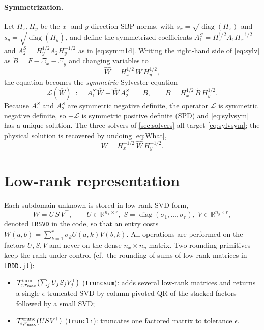 \documentclass[hidelinks,onefignum,onetabnum]{siamart250211}
\newcommand{\R}{\mathbb{R}}
\newcommand{\Hx}{H_x}
\newcommand{\Hy}{H_y}
\newcommand{\Aone}{A_1}
\newcommand{\Atwo}{A_2}
\newcommand{\AoneS}{A_1^{S}}
\newcommand{\AtwoS}{A_2^{S}}
\newcommand{\What}{\widehat{W}}
\newcommand{\Lop}{\mathcal{L}}
\begin{document}
\paragraph{Symmetrization.}  Let $\Hx, \Hy$ be the $x$- and $y$-direction SBP
norms, with $s_x = \sqrt{\operatorname{diag}(\Hx)}$ and
$s_y = \sqrt{\operatorname{diag}(\Hy)}$, and define the symmetrized coefficients
$\AoneS = \Hx^{1/2}\Aone\Hx^{-1/2}$ and $\AtwoS = \Hy^{1/2}\Atwo\Hy^{-1/2}$ as in
\cref{eq:symm1d}.  Writing the right-hand side of \cref{eq:sylv} as
$\widetilde{B} = F - \Xi_x - \Xi_y$ and changing variables to
\begin{equation}
\label{eq:What}
\What = \Hx^{1/2}\,W\,\Hy^{1/2},
\end{equation}
the equation becomes the \emph{symmetric} Sylvester equation
\begin{equation}
\label{eq:sylvsym}
\Lop(\What) \;:=\; \AoneS\,\What + \What\,\AtwoS \;=\; B,
\qquad B = \Hx^{1/2}\,\widetilde{B}\,\Hy^{1/2}.
\end{equation}
Because $\AoneS$ and $\AtwoS$ are symmetric negative definite, the operator
$\Lop$ is symmetric negative definite, so $-\Lop$ is symmetric positive definite
(SPD) and \cref{eq:sylvsym} has a unique solution.  The three solvers of
\cref{sec:solvers} all target \cref{eq:sylvsym}; the physical solution is
recovered by undoing \cref{eq:What},
\begin{equation}
\label{eq:unwind}
W = \Hx^{-1/2}\,\What\,\Hy^{-1/2}.
\end{equation}

\section{Low-rank representation}
\label{sec:lowrank}
Each subdomain unknown is stored in low-rank SVD form,
\begin{equation}
\label{eq:lrsvd}
W = U\, S\, V^{\!\top}, \qquad
U\in\R^{n_x\times r},\; S=\operatorname{diag}(\sigma_1,\dots,\sigma_r),\;
V\in\R^{n_y\times r},
\end{equation}
denoted {\tt LRSVD} in the code, so that an entry costs
$W(a,b)=\sum_{k=1}^{r}\sigma_k U(a,k)V(b,k)$.  All operations are performed on
the factors $U,S,V$ and never on the dense $n_x\times n_y$ matrix.  Two rounding
primitives keep the rank under control (cf.\ the rounding of sums of low-rank
matrices in {\tt LRDD.jl}):
\begin{itemize}
\item $\mathcal{T}_{\epsilon,r_{\max}}^{\rm sum}\bigl(\sum_j U_jS_jV_j^{\!\top}\bigr)$
  ({\tt truncsum}): adds several low-rank matrices and returns a single
  $\epsilon$-truncated SVD by column-pivoted QR of the stacked factors followed
  by a small SVD;
\item $\mathcal{T}_{\epsilon,r_{\max}}^{\rm trunc}(USV^{\!\top})$
  ({\tt trunclr}): truncates one factored matrix to tolerance $\epsilon$.
\end{itemize}
\end{document}
